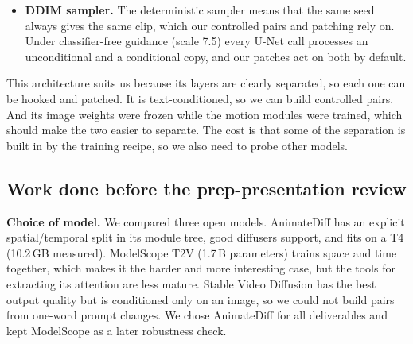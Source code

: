 \documentclass[twoside,english]{article}
\begin{document}
\begin{itemize}
  layers in each block. It reshapes the activation from $(B\cdot F, C, H, W)$ to $(B\cdot H\cdot W, F, C)$
  so that the frames form a sequence, adds a sinusoidal position embedding, applies two temporal
  self-attention layers and a feed-forward layer, and adds the result back to the input through a
  zero-initialised output layer (Eq.~\eqref{eq:motion_module}). Temporal attention is the only place
  where information crosses between frames, so it is the only place where motion can be computed.
  Without the position embedding, forward and backward motion would look the same. The residual
  addition is why content and motion mix in the module's output, so we cannot simply copy the whole
  output of a layer. The attention probabilities are frame-to-frame matrices, and they are what our
  attention injection baseline copies.
\item \textbf{DDIM sampler.} The deterministic sampler means that the same seed always gives the same
  clip, which our controlled pairs and patching rely on. Under classifier-free guidance (scale 7.5)
  every U-Net call processes an unconditional and a conditional copy, and our patches act on both by
  default.
\end{itemize}

This architecture suits us because its layers are clearly separated, so each one can be hooked and
patched. It is text-conditioned, so we can build controlled pairs. And its image weights were frozen
while the motion modules were trained, which should make the two easier to separate. The cost is that
some of the separation is built in by the training recipe, so we also need to probe other models.

\subsection{Work done before the prep-presentation review} \label{sec:before}

\textbf{Choice of model.} We compared three open models. AnimateDiff has an explicit spatial/temporal
split in its module tree, good diffusers support, and fits on a T4 (10.2\,GB measured). ModelScope T2V
(1.7\,B parameters) trains space and time together, which makes it the harder and more interesting
case, but the tools for extracting its attention are less mature. Stable Video Diffusion has the best
output quality but is conditioned only on an image, so we could not build pairs from one-word prompt
changes. We chose AnimateDiff for all deliverables and kept ModelScope as a later robustness check.
\end{document}
